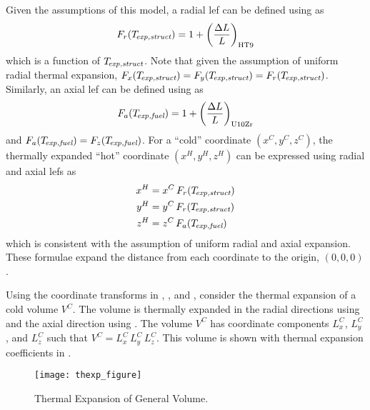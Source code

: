     Given the assumptions of this model, a radial \gls{lef} can be defined using 
     as
    \begin{equation}
      \label{eq:lef_r}
      F_r(T_{\!\mbox{\scriptsize \em exp,struct}}) = 1 + \left(\frac{\Delta L}{L}\right)_{\text{HT9}}
    \end{equation}
    which is a function of $T_{\!\mbox{\scriptsize \em exp,struct}}$. Note that given the assumption of 
    uniform radial thermal expansion, ${F_x(T_{\!\mbox{\scriptsize \em exp,struct}}) = F_y(T_{\!\mbox{\scriptsize \em exp,struct}}) =
    F_r(T_{\!\mbox{\scriptsize \em exp,struct}})}$.
    Similarly, an axial \gls{lef} can be defined using  as 
    \begin{equation}
      \label{eq:lef_a}
      F_a({T_{\!\mbox{\scriptsize \em exp,fuel}}}) = 1 + \left(\frac{\Delta L}{L}\right)_{\text{U10Zr}}
    \end{equation}
    and $F_a({T_{\!\mbox{\scriptsize \em exp,fuel}}}) = F_z({T_{\!\mbox{\scriptsize \em exp,fuel}}})$. For a ``cold'' coordinate 
    $(x^C,y^C,z^C)$, the thermally expanded ``hot'' coordinate $(x^H,y^H,z^H)$ 
    can be expressed using radial and axial \glspl{lef} as
    \begin{align}
      \label{eq:expand_x}
      x^H &= x^C \, F_r(T_{\!\mbox{\scriptsize \em exp,struct}}) \\
      \label{eq:expand_y}
      y^H &= y^C \, F_r(T_{\!\mbox{\scriptsize \em exp,struct}}) \\
      \label{eq:expand_z}
      z^H &= z^C \, F_a({T_{\!\mbox{\scriptsize \em exp,fuel}}})
    \end{align}
    which is consistent with the assumption of uniform radial and axial 
    expansion. These formulae expand the distance from each coordinate to the
    origin, $(0,0,0)$.

    Using the coordinate transforms in , ,
    and , consider the thermal expansion of a cold volume
    $V^C$. The volume is thermally expanded in the radial directions using
     and the axial direction using . The volume
    $V^C$ has coordinate components $L_x^C$, $L_y^C$, and $L_z^C$ such that
    ${V^C = L_x^C \, L_y^C \, L_z^C}$. This volume is shown with thermal
    expansion coefficients in .

    \begin{figure}
      \centering
      \texttt{[image: thexp\_figure]}
      \caption{Thermal Expansion of General Volume.}
      \label{fig:thexp_figure}
    \end{figure}
    
